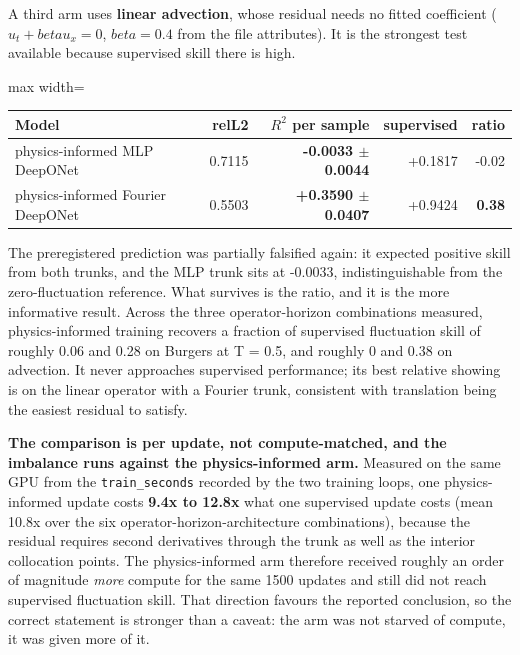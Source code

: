 \documentclass[preprint,12pt]{elsarticle}
\begin{document}
A third arm uses \textbf{linear advection}, whose residual needs no fitted coefficient ($u_t + beta u_x = 0$, $beta = 0.4$ from the file attributes). It is the strongest test available because supervised skill there is high.

\begin{center}
\begin{adjustbox}{max width=\linewidth}
\small
\begin{tabular}{lrrrr}
\toprule
Model & relL2 & \textbf{$R^2$ per sample} & supervised & ratio \\
\midrule
physics-informed MLP DeepONet & 0.7115 & \textbf{-0.0033 $\pm$ 0.0044} & +0.1817 & -0.02 \\
physics-informed Fourier DeepONet & 0.5503 & \textbf{+0.3590 $\pm$ 0.0407} & +0.9424 & \textbf{0.38} \\
\bottomrule
\end{tabular}
\end{adjustbox}
\end{center}


The preregistered prediction was partially falsified again: it expected positive skill from both trunks, and the MLP trunk sits at -0.0033, indistinguishable from the zero-fluctuation reference. What survives is the ratio, and it is the more informative result. Across the three operator-horizon combinations measured, physics-informed training recovers a fraction of supervised fluctuation skill of roughly 0.06 and 0.28 on Burgers at T = 0.5, and roughly 0 and 0.38 on advection. It never approaches supervised performance; its best relative showing is on the linear operator with a Fourier trunk, consistent with translation being the easiest residual to satisfy.

\textbf{The comparison is per update, not compute-matched, and the imbalance runs against the physics-informed arm.} Measured on the same GPU from the \texttt{train\_seconds} recorded by the two training loops, one physics-informed update costs \textbf{9.4x to 12.8x} what one supervised update costs (mean 10.8x over the six operator-horizon-architecture combinations), because the residual requires second derivatives through the trunk as well as the interior collocation points. The physics-informed arm therefore received roughly an order of magnitude \emph{more} compute for the same 1500 updates and still did not reach supervised fluctuation skill. That direction favours the reported conclusion, so the correct statement is stronger than a caveat: the arm was not starved of compute, it was given more of it.
\end{document}
